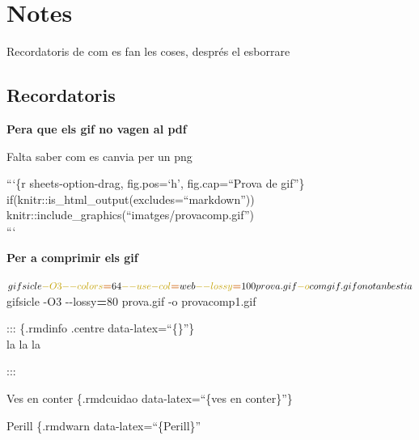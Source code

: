 \documentclass[
  10pt,
]{krantz}
\newenvironment{Shaded}{\begin{snugshade}}{\end{snugshade}}
\newcommand{\AttributeTok}[1]{\textcolor[rgb]{0.77,0.63,0.00}{#1}}
\newcommand{\ExtensionTok}[1]{#1}
\newcommand{\NormalTok}[1]{#1}
\newcommand{\OperatorTok}[1]{\textcolor[rgb]{0.81,0.36,0.00}{\textbf{#1}}}
\begin{document}
\hypertarget{notes}{%
\chapter{Notes}\label{notes}}

Recordatoris de com es fan les coses, després el esborrare

\hypertarget{recordatoris}{%
\section{Recordatoris}\label{recordatoris}}

\textbf{Pera que els gif no vagen al pdf}

Falta saber com es canvia per un png

```\{r sheets-option-drag, fig.pos=`h', fig.cap=``Prova de gif''\}\\
if(knitr::is\_html\_output(excludes=``markdown'')) knitr::include\_graphics(``imatges/provacomp.gif'')\\
```

\textbf{Per a comprimir els gif}

\begin{Shaded}
\begin{Highlighting}[]
\ExtensionTok{$}\NormalTok{ gifsicle }\AttributeTok{{-}O3} \AttributeTok{{-}{-}colors}\OperatorTok{=}\NormalTok{64 }\AttributeTok{{-}{-}use{-}col}\OperatorTok{=}\NormalTok{web }\AttributeTok{{-}{-}lossy}\OperatorTok{=}\NormalTok{100 prova.gif }\AttributeTok{{-}o}\NormalTok{ comgif.gif  }
\ExtensionTok{o}\NormalTok{ no tan bestia  }
\ExtensionTok{$}\NormalTok{ gifsicle }\AttributeTok{{-}O3} \AttributeTok{{-}{-}lossy}\OperatorTok{=}\NormalTok{80 prova.gif }\AttributeTok{{-}o}\NormalTok{ provacomp1.gif  }
\end{Highlighting}
\end{Shaded}

\begin{rmdinfo}{}
::: \{.rmdinfo .centre data-latex=``\{\}''\}\\
la la la\\

\end{rmdinfo}

:::

\begin{rmdcuidao}{Ves en conter}
\{.rmdcuidao data-latex=``\{ves en conter\}''\}

\end{rmdcuidao}

\begin{rmdwarn}{Perill}
\{.rmdwarn data-latex=``\{Perill\}''

\end{rmdwarn}
\end{document}
